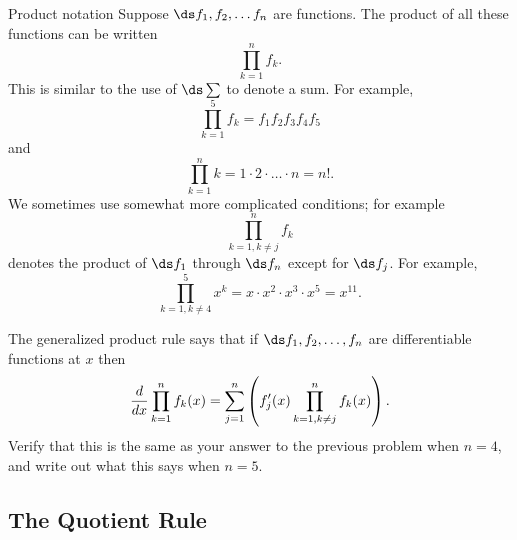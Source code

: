 \begin{exercises}
\begin{remark}{Product notation}
Suppose $\ds f_1 , f_2 , \ldots f_n$ are functions.
The product of all these functions can be written
$$ \prod _{k=1 } ^n f_k.$$
This is similar to the use of $\ds \sum$ to denote a 
sum.
For example,
$$\prod _{k=1 } ^5 f_k =f_1 f_2 f_3 f_4 f_5$$
and
$$
\prod _ {k=1 } ^n k = 1\cdot 2 \cdot \ldots \cdot n = n!.$$
We sometimes use somewhat more complicated conditions; for example
$$\prod _{k=1 , k\neq j } ^n f_k$$
denotes the product of $\ds f_1$ through $\ds f_n$ except for $\ds f_j$.
For example, 
$$\prod _{k=1 , k\neq 4} ^5 x^k = x\cdot x^2 \cdot x^3 \cdot x^5 =
x^{11}.$$
\end{remark}

\begin{exercise}
  The {\dfont generalized product rule\/} 
says that if $\ds f_1 , f_2 ,\ldots ,f_n$ are differentiable functions at
  $x$ then
$${d\over dx}\prod _{k=1 } ^n f_k(x) = 
\sum _{j=1 } ^n \left(f'_j (x) \prod _{k=1 , k\neq j} ^n
   f_k (x)\right).$$
Verify that this is the same as your answer to the previous problem
when $n=4$,
and write out what this says when $n=5$.
\end{exercise}


\end{exercises}





\subsection{The Quotient Rule}


